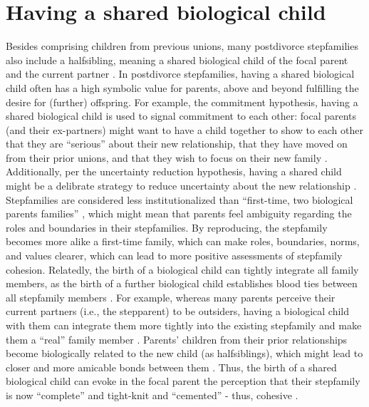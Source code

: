 \documentclass[\pandocDocMode,longtable,floatsintext]{apa6}
\begin{document}
\hypertarget{having-a-shared-biological-child}{%
\section{Having a shared biological
child}\label{having-a-shared-biological-child}}

Besides comprising children from previous unions, many postdivorce
stepfamilies also include a halfsibling, meaning a shared biological
child of the focal parent and the current partner
\autocite{sanner2020shared}. In postdivorce stepfamilies, having a
shared biological child often has a high symbolic value for parents,
above and beyond fulfilling the desire for (further) offspring. For
example, the commitment hypothesis, having a shared biological child is
used to signal commitment to each other: focal parents (and their
ex-partners) might want to have a child together to show to each other
that they are ``serious'' about their new relationship, that they have
moved on from their prior unions, and that they wish to focus on their
new family \autocite{vikat1999stepfamily}. Additionally, per the
uncertainty reduction hypothesis, having a shared child might be a
delibrate strategy to reduce uncertainty about the new relationship
\autocite{uncertainty}. Stepfamilies are considered less
institutionalized than ``first-time, two biological parents families''
\autocite{cherlin1978remarriage}, which might mean that parents feel
ambiguity regarding the roles and boundaries in their stepfamilies. By
reproducing, the stepfamily becomes more alike a first-time family,
which can make roles, boundaries, norms, and values clearer, which can
lead to more positive assessments of stepfamily cohesion. Relatedly, the
birth of a biological child can tightly integrate all family members, as
the birth of a further biological child establishes blood ties between
all stepfamily members \autocite{bernstein1990yours}. For example,
whereas many parents perceive their current partners (i.e., the
stepparent) to be outsiders, having a biological child with them can
integrate them more tightly into the existing stepfamily and make them a
``real'' family member \autocite[
\textcite{castren2015insiders}]{bernstein1990yours}. Parents' children
from their prior relationships become biologically related to the new
child (as halfsiblings), which might lead to closer and more amicable
bonds between them \autocite{sanner2018half}. Thus, the birth of a
shared biological child can evoke in the focal parent the perception
that their stepfamily is now ``complete'' and tight-knit and
``cemented'' - thus, cohesive \autocite{ganong1988mutual}.
\end{document}
